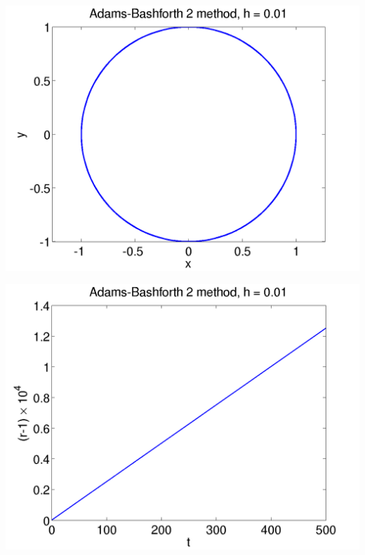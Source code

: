 \documentclass{beamer}
\begin{document}
\begin{frame}
\begin{columns}
\begin{column}{0.5\textwidth}
\begin{overlayarea}{\textwidth}{0.6\textheight}
{\begin{center}
          \end{center}
        }
        {
          \begin{center}
            \includegraphics[height=0.5\textheight]{figures/AB2_2}
          \end{center}
        }
        {
          \begin{center}
            \includegraphics[height=0.5\textheight]{figures/AB2_rad2}
          \end{center}
        }
      \end{overlayarea}
    \end{column}
  \end{columns}

\end{frame}
\end{document}
